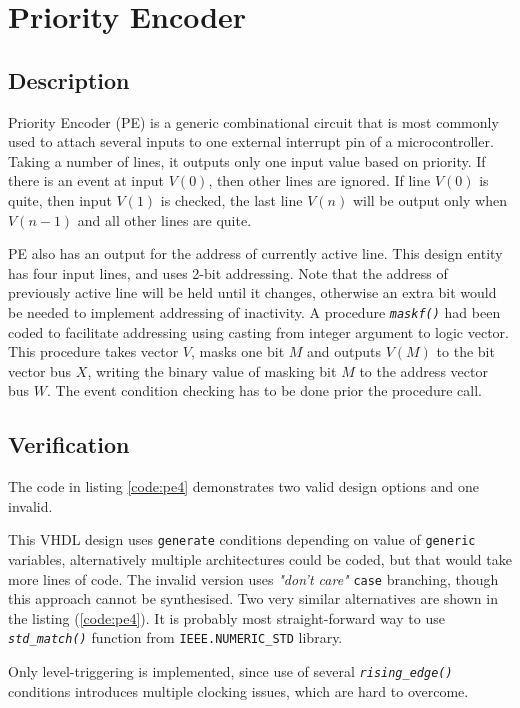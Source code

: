 \documentclass[10pt,a4paper]{report}
\begin{document}
\pagebreak
\section{Priority Encoder}
\subsection{Description}

 Priority Encoder (PE) is a generic combinational
 circuit that is most commonly used to attach
 several inputs to one external interrupt pin of
 a microcontroller. Taking a number of lines, it
 outputs only one input value based on priority.
 If there is an event at input $V(0)$, then other
 lines are ignored. If line $V(0)$ is quite,
 then input $V(1)$ is checked, the last line
 $V(n)$ will be output only when $V(n-1)$ and all
 other lines are quite.

 PE also has an output for the address of currently
 active line. This design entity has four input
 lines, and uses 2-bit addressing. Note that the
 address of previously active line will be held
 until it changes, otherwise an extra bit would
 be needed to implement addressing of inactivity.
 A procedure \emph{\texttt{maskf()}} had been
 coded to facilitate addressing using casting
 from integer argument to logic vector.
 This procedure takes vector $V$, masks one bit
 $M$ and outputs $V(M)$ to the bit vector bus $X$,
 writing the binary value of masking bit $M$ to the
 address vector bus $W$. The event condition checking
 has to be done prior the procedure call.


\subsection{Verification}

 The code in listing \ref{code:pe4} demonstrates
 two valid design options and one invalid.

 This VHDL design uses \texttt{generate} conditions
 depending on value of \texttt{generic} variables,
 alternatively multiple architectures could be
 coded, but that would take more lines of code.
 The invalid version uses \emph{"don't care"}
 \texttt{case} branching, though this approach
 cannot be synthesised.
 Two very similar alternatives are shown in
 the listing (\ref{code:pe4}).
 It is probably most straight-forward way to
 use \emph{\texttt{std\_match()}} function from
 \texttt{IEEE.NUMERIC\_STD} library.
 
 Only level-triggering is implemented, since
 use of several \emph{\texttt{rising\_edge()}}
 conditions introduces multiple clocking issues,
 which are hard to overcome.
\end{document}
